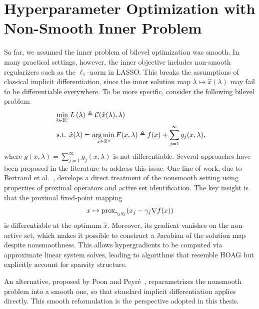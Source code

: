 \documentclass[11pt, twoside]{report}
\begin{document}
\section{Hyperparameter Optimization with Non-Smooth Inner Problem}
\label{section-hoag_nonsmooth}
So far, we assumed the inner problem of bilevel optimization was smooth. In many practical settings, however, the inner objective includes non-smooth regularizers such as the $\ell_1$-norm in LASSO. This breaks the assumptions of classical implicit differentiation, since the inner solution map $\lambda \mapsto \hat{x}(\lambda)$ may fail to be differentiable everywhere. To be more specific, consider the following bilevel problem:
\begin{align} 
&\min _{\lambda \in \mathbb{R}^r} L\left(\lambda \right) \triangleq \mathcal{C}(\hat{x}(\lambda),\lambda) \label{bilev_ns1}\\
&\text { s.t. } \hat{x}(\lambda) =\underset{x \in \mathbb{R}^{n}} {\operatorname*{arg\, min \,}} {F(x,\lambda) \triangleq f(x) + \sum_{j=1}^\infty g_j(x,\lambda)} \label{inprob_ns},
\end{align}
where $g(x,\lambda) = \sum_{j=1}^\infty g_j(x,\lambda)$ is not differentiable. Several approaches have been proposed in the literature to address this issue. One line of work, due to Bertrand et al.~\cite{bertrand2022implicit}, develops a direct treatment of the nonsmooth setting using properties of proximal operators and active set identification. The key insight is that the proximal fixed-point mapping  
\[
x \mapsto \operatorname{prox}_{\gamma_j g_j}(x_j - \gamma_j \nabla f(x))
\]  
is differentiable at the optimum $\hat{x}$. Moreover, its gradient vanishes on the non-active set, which makes it possible to construct a Jacobian of the solution map despite nonsmoothness. This allows hypergradients to be computed via approximate linear system solves, leading to algorithms that resemble HOAG but explicitly account for sparsity structure.  

An alternative, proposed by Poon and Peyré~\cite{poon}, reparametrizes the nonsmooth problem into a smooth one, so that standard implicit differentiation applies directly. This smooth reformulation is the perspective adopted in this thesis.  
\end{document}
